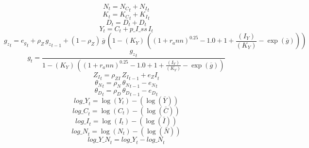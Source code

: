 \begin{dmath}
{{N}}_{t}={{N_C}}_{t}+{{N_I}}_{t}
\end{dmath}
\begin{dmath}
{{K}}_{t}={{K_C}}_{t}+{{K_I}}_{t}
\end{dmath}
\begin{dmath}
{{D}}_{t}={{D}}_{t}+{{D}}_{t}
\end{dmath}
\begin{dmath}
{{Y}}_{t}={{C}}_{t}+{p\_I\_ss}\, {{I}}_{t}
\end{dmath}
\begin{dmath}
{{g_z}}_{t}={{e_g}}_{t}+{{\rho_Z}}\, {{g_z}}_{t-1}+\left(1-{{\rho_Z}}\right)\, {{\overline{g}}}\, \left(1-{(K_Y)}\, \left(\left(1+{{r_ann}}\right)^{0.25}-1.0+1+\frac{{(I_Y)}}{{(K_Y)}}-\exp\left({{\overline{g}}}\right)\right)\right)
\end{dmath}
\begin{dmath}
{{g}}_{t}=\frac{{{g_z}}_{t}}{1-{(K_Y)}\, \left(\left(1+{{r_ann}}\right)^{0.25}-1.0+1+\frac{{(I_Y)}}{{(K_Y)}}-\exp\left({{\overline{g}}}\right)\right)}
\end{dmath}
\begin{dmath}
{{Z_I}}_{t}={{\rho_{ZI}}}\, {{Z_I}}_{t-1}+{{e_ZI}}_{t}
\end{dmath}
\begin{dmath}
{{\theta_N}}_{t}={{\rho_N}}\, {{\theta_N}}_{t-1}-{{e_N}}_{t}
\end{dmath}
\begin{dmath}
{{\theta_D}}_{t}={{\rho_D}}\, {{\theta_D}}_{t-1}-{{e_D}}_{t}
\end{dmath}
\begin{dmath}
{log\_Y}_{t}=\log\left({{Y}}_{t}\right)-(\log\left(\bar{{Y}}\right))
\end{dmath}
\begin{dmath}
{log\_C}_{t}=\log\left({{C}}_{t}\right)-(\log\left(\bar{{C}}\right))
\end{dmath}
\begin{dmath}
{log\_I}_{t}=\log\left({{I}}_{t}\right)-(\log\left(\bar{{I}}\right))
\end{dmath}
\begin{dmath}
{log\_N}_{t}=\log\left({{N}}_{t}\right)-(\log\left(\bar{{N}}\right))
\end{dmath}
\begin{dmath}
{log\_Y\_N}_{t}={log\_Y}_{t}-{log\_N}_{t}
\end{dmath}
